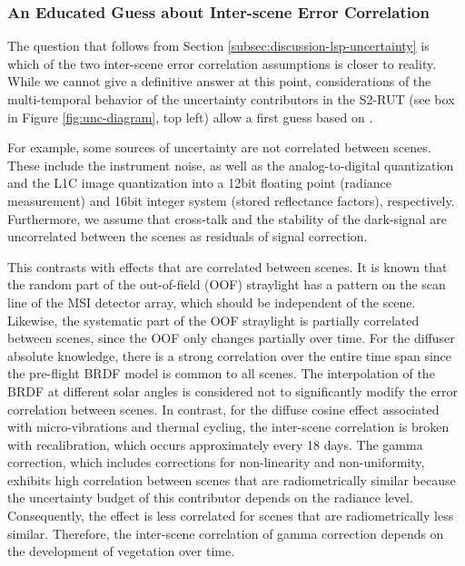 \subsubsection{An Educated Guess about Inter-scene Error Correlation}

The question that follows from Section \ref{subsec:discussion-lsp-uncertainty} is which of the two inter-scene error correlation assumptions is closer to reality. While we cannot give a definitive answer at this point, considerations of the multi-temporal behavior of the uncertainty contributors in the \gls{S2-RUT} (see box in Figure \ref{fig:unc-diagram}, top left) allow a first guess based on \cite{gorrono_radiometric_2017, gorrono_providing_2018}.

For example, some sources of uncertainty are not correlated between scenes. These include the instrument noise, as well as the analog-to-digital quantization and the L1C image quantization into a 12bit floating point (radiance measurement) and 16bit integer system (stored reflectance factors), respectively. Furthermore, we assume that cross-talk and the stability of the dark-signal are uncorrelated between the scenes as residuals of signal correction.

This contrasts with effects that are correlated between scenes. It is known that the random part of the out-of-field (OOF) straylight has a pattern on the scan line of the \gls{MSI} detector array, which should be independent of the scene. Likewise, the systematic part of the OOF straylight is partially correlated between scenes, since the OOF only changes partially over time. For the diffuser absolute knowledge, there is a strong correlation over the entire time span since the pre-flight \gls{BRDF} model is common to all scenes. The interpolation of the \gls{BRDF} at different solar angles is considered not to significantly modify the error correlation between scenes. In contrast, for the diffuse cosine effect associated with micro-vibrations and thermal cycling, the inter-scene correlation is broken with recalibration, which occurs approximately every 18 days. The gamma correction, which includes corrections for non-linearity and non-uniformity, exhibits high correlation between scenes that are radiometrically similar because the uncertainty budget of this contributor depends on the radiance level. Consequently, the effect is less correlated for scenes that are radiometrically less similar. Therefore, the inter-scene correlation of gamma correction depends on the development of vegetation over time.

